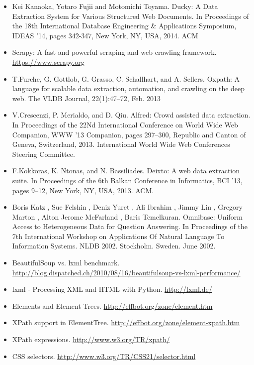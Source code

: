 \documentclass[letterpaper,12pt,english]{sphinxmanual}
\begin{document}
\label{index:references}\begin{itemize}
\item {} 
Kei Kanaoka, Yotaro Fujii and Motomichi Toyama. Ducky: A Data Extraction System for Various Structured Web Documents. In Proceedings of the 18th International Database Engineering \& Applications Symposium, IDEAS ’14, pages 342-347, New York, NY, USA, 2014. ACM

\item {} 
Scrapy: A fast and powerful scraping and web crawling framework. \href{https://www.scrapy.org}{https://www.scrapy.org}

\item {} 
T.Furche, G. Gottlob, G. Grasso, C. Schallhart, and A. Sellers. Oxpath: A language for scalable data extraction, automation, and crawling on the deep web. The VLDB Journal, 22(1):47–72, Feb. 2013

\item {} 
V.Crescenzi, P. Merialdo, and D. Qiu. Alfred: Crowd assisted data extraction. In Proceedings of the 22Nd International Conference on World Wide Web Companion, WWW ’13 Companion, pages 297–300, Republic and Canton of Geneva, Switzerland, 2013. International World Wide Web Conferences Steering Committee.

\item {} 
F.Kokkoras, K. Ntonas, and N. Bassiliades. Deixto: A web data extraction suite. In Proceedings of the 6th Balkan Conference in Informatics, BCI ’13, pages 9–12, New York, NY, USA, 2013. ACM.

\item {} 
Boris Katz , Sue Felshin , Deniz Yuret , Ali Ibrahim , Jimmy Lin , Gregory Marton , Alton Jerome McFarland , Baris Temelkuran. Omnibase: Uniform Access to Heterogeneous Data for Question Answering. In Proceedings of the 7th International Workshop on Applications Of Natural Language To Information Systems. NLDB 2002. Stockholm. Sweden. June 2002.

\item {} 
BeautifulSoup vs. lxml benchmark. \href{http://blog.dispatched.ch/2010/08/16/beautifulsoup-vs-lxml-performance/}{http://blog.dispatched.ch/2010/08/16/beautifulsoup-vs-lxml-performance/}

\item {} 
lxml - Processing XML and HTML with Python. \href{http://lxml.de/}{http://lxml.de/}

\item {} 
Elements and Element Trees. \href{http://effbot.org/zone/element.htm}{http://effbot.org/zone/element.htm}

\item {} 
XPath support in ElementTree. \href{http://effbot.org/zone/element-xpath.htm}{http://effbot.org/zone/element-xpath.htm}

\item {} 
XPath expressions. \href{http://www.w3.org/TR/xpath/}{http://www.w3.org/TR/xpath/}

\item {} 
CSS selectors. \href{http://www.w3.org/TR/CSS21/selector.html}{http://www.w3.org/TR/CSS21/selector.html}

\end{itemize}
\end{document}
